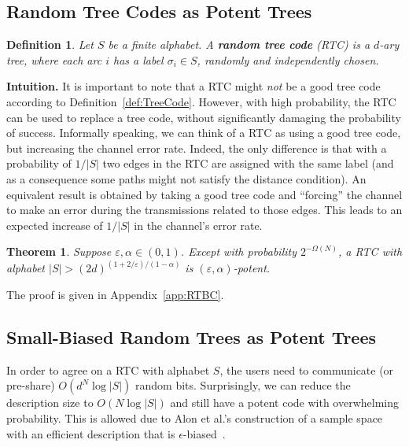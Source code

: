 \documentclass[ letterpaper, 11pt]{article}
\newtheorem{theorem}{Theorem}[section]
\newtheorem{definition}{Definition}
\newcommand{\eps}{\varepsilon}
\newcommand{\potent}{potent\xspace}
\newcommand{\RTBC}{\textsf{RTC}\xspace}
\begin{document}
\subsection{Random Tree Codes as Potent Trees}


\begin{definition}
Let $S$ be a finite alphabet.
A {\bf random tree code} (\RTBC) is a $d$-ary tree,
where each arc $i$ has a label $\sigma_i\in S$,
randomly and independently chosen.
\end{definition}

\noindent
\textbf{Intuition.}
It is important to note that a \RTBC might {\em not} be a good tree code
according to Definition~\ref{def:TreeCode}.
However, with high probability, the \RTBC can be used to replace a tree code, without significantly
damaging the probability of success.
Informally speaking, we can think of a \RTBC as using a good tree code, but increasing
the channel error rate. Indeed, the only difference is that with a probability of
$1/|S|$ two edges in the \RTBC are assigned with the same label
(and as a consequence some paths might not satisfy the distance condition).
An equivalent result is obtained by taking a good tree code and ``forcing'' the channel
to make an error during the transmissions related to those edges.
This leads to an expected increase of $1/|S|$ in the channel's error rate.



\begin{theorem}\label{thm:RTCisPotent}
Suppose $\eps,\alpha \in (0,1)$.
Except with probability $2^{-\Omega(N)}$,
a \RTBC with alphabet $|S|>(2d)^{(1+2/\eps)/(1-\alpha)}$
is $(\varepsilon,\alpha)$-\potent.
\end{theorem}
\noindent The proof is given in Appendix~\ref{app:RTBC}.
\bigskip



\subsection{Small-Biased Random Trees as Potent Trees}


In order to agree on a \RTBC with alphabet $S$, the users need to communicate
(or pre-share) $O(d^N\log |S|)$ random bits. Surprisingly, we can reduce the description size to
$O(N\log|S|)$ and still have a \potent code with overwhelming probability.
This is allowed due to Alon et al.'s construction of  a sample space with an efficient description
that is $\epsilon$-biased~\cite{AGHP92}.
\end{document}
